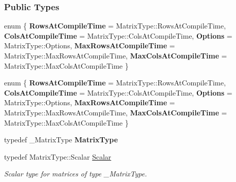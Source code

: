 \subsubsection*{Public Types}
\begin{DoxyCompactItemize}
\item 
\mbox{\label{group___eigenvalues___module_af2c13de6cba066406b8fa582b3468b29}} 
enum \{ \newline
{\bfseries Rows\+At\+Compile\+Time} = Matrix\+Type\+:\+:Rows\+At\+Compile\+Time, 
{\bfseries Cols\+At\+Compile\+Time} = Matrix\+Type\+:\+:Cols\+At\+Compile\+Time, 
{\bfseries Options} = Matrix\+Type\+:\+:Options, 
{\bfseries Max\+Rows\+At\+Compile\+Time} = Matrix\+Type\+:\+:Max\+Rows\+At\+Compile\+Time, 
\newline
{\bfseries Max\+Cols\+At\+Compile\+Time} = Matrix\+Type\+:\+:Max\+Cols\+At\+Compile\+Time
 \}
\item 
\mbox{\label{group___eigenvalues___module_a69ee22261cc0695254e0687a807d7cd3}} 
enum \{ \newline
{\bfseries Rows\+At\+Compile\+Time} = Matrix\+Type\+:\+:Rows\+At\+Compile\+Time, 
{\bfseries Cols\+At\+Compile\+Time} = Matrix\+Type\+:\+:Cols\+At\+Compile\+Time, 
{\bfseries Options} = Matrix\+Type\+:\+:Options, 
{\bfseries Max\+Rows\+At\+Compile\+Time} = Matrix\+Type\+:\+:Max\+Rows\+At\+Compile\+Time, 
\newline
{\bfseries Max\+Cols\+At\+Compile\+Time} = Matrix\+Type\+:\+:Max\+Cols\+At\+Compile\+Time
 \}
\item 
\mbox{\label{group___eigenvalues___module_afb9e799fdea51d173e310c82d80d5947}} 
typedef \+\_\+\+Matrix\+Type {\bfseries Matrix\+Type}
\item 
\mbox{\label{group___eigenvalues___module_a9a8ee9df37ee1f90d0e53103c58683c0}} 
typedef Matrix\+Type\+::\+Scalar \hyperlink{group___eigenvalues___module_a9a8ee9df37ee1f90d0e53103c58683c0}{Scalar}
\begin{DoxyCompactList}\small\item\em Scalar type for matrices of type {\ttfamily \+\_\+\+Matrix\+Type}. \end{DoxyCompactList}\item 
\mbox{\label{group___eigenvalues___module_a360081b7ad59db28b9955dea3e4b7dd7}} 

\end{DoxyCompactItemize}
